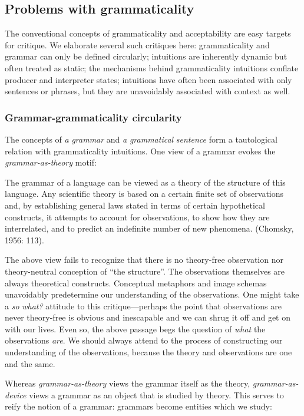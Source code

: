 \subsection{Problems with grammaticality}

The conventional concepts of grammaticality and acceptability are easy targets for critique. We elaborate several such critiques here: grammaticality and grammar can only be defined circularly; intuitions are inherently dynamic but often treated as static; the mechanisms behind grammaticality intuitions conflate producer and interpreter states; intuitions have often been associated with only sentences or phrases, but they are unavoidably associated with context as well.

\subsubsection{Grammar-grammaticality circularity}

The concepts of \textit{a} \textit{grammar} and \textit{a} \textit{grammatical} \textit{sentence} form a tautological relation with grammaticality intuitions. One view of a grammar evokes the \textit{grammar-as-theory} motif:

The grammar of a language can be viewed as a theory of the structure of this language. Any scientific theory is based on a certain finite set of observations and, by establishing general laws stated in terms of certain hypothetical constructs, it attempts to account for observations, to show how they are interrelated, and to predict an indefinite number of new phenomena. (Chomsky, 1956: 113).

  The above view fails to recognize that there is no theory-free observation nor theory-neutral conception of “the structure”. The observations themselves are always theoretical constructs. Conceptual metaphors and image schemas unavoidably predetermine our understanding of the observations. One might take a \textit{so} \textit{what?} attitude to this critique—perhaps the point that observations are never theory-free is obvious and inescapable and we can shrug it off and get on with our lives. Even so, the above passage begs the question of \textit{what} the observations \textit{are}. We should always attend to the process of constructing our understanding of the observations, because the theory and observations are one and the same.

  Whereas \textit{grammar-as-theory} views the grammar itself as the theory, \textit{grammar-as-device} views a grammar as an object that is studied by theory. This serves to reify the notion of a grammar: grammars become entities which we study:

